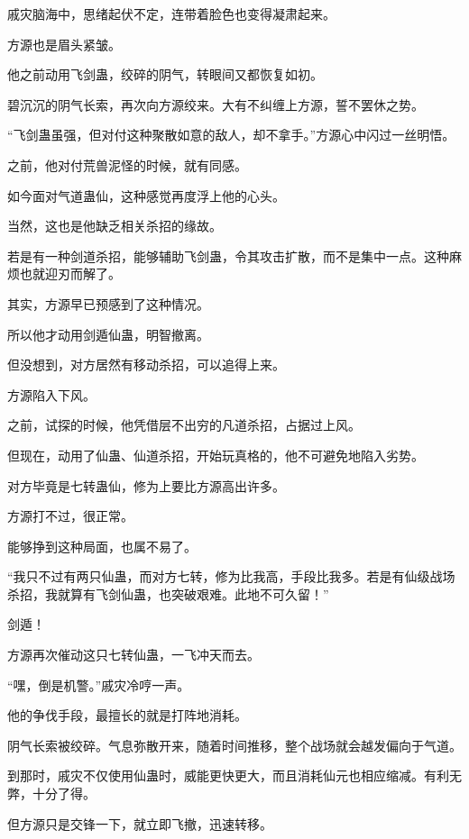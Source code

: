 
\begin{this_body}

戚灾脑海中，思绪起伏不定，连带着脸色也变得凝肃起来。

方源也是眉头紧皱。

他之前动用飞剑蛊，绞碎的阴气，转眼间又都恢复如初。

碧沉沉的阴气长索，再次向方源绞来。大有不纠缠上方源，誓不罢休之势。

“飞剑蛊虽强，但对付这种聚散如意的敌人，却不拿手。”方源心中闪过一丝明悟。

之前，他对付荒兽泥怪的时候，就有同感。

如今面对气道蛊仙，这种感觉再度浮上他的心头。

当然，这也是他缺乏相关杀招的缘故。

若是有一种剑道杀招，能够辅助飞剑蛊，令其攻击扩散，而不是集中一点。这种麻烦也就迎刃而解了。

其实，方源早已预感到了这种情况。

所以他才动用剑遁仙蛊，明智撤离。

但没想到，对方居然有移动杀招，可以追得上来。

方源陷入下风。

之前，试探的时候，他凭借层不出穷的凡道杀招，占据过上风。

但现在，动用了仙蛊、仙道杀招，开始玩真格的，他不可避免地陷入劣势。

对方毕竟是七转蛊仙，修为上要比方源高出许多。

方源打不过，很正常。

能够挣到这种局面，也属不易了。

“我只不过有两只仙蛊，而对方七转，修为比我高，手段比我多。若是有仙级战场杀招，我就算有飞剑仙蛊，也突破艰难。此地不可久留！”

剑遁！

方源再次催动这只七转仙蛊，一飞冲天而去。

“嘿，倒是机警。”戚灾冷哼一声。

他的争伐手段，最擅长的就是打阵地消耗。

阴气长索被绞碎。气息弥散开来，随着时间推移，整个战场就会越发偏向于气道。

到那时，戚灾不仅使用仙蛊时，威能更快更大，而且消耗仙元也相应缩减。有利无弊，十分了得。

但方源只是交锋一下，就立即飞撤，迅速转移。


\end{this_body}
